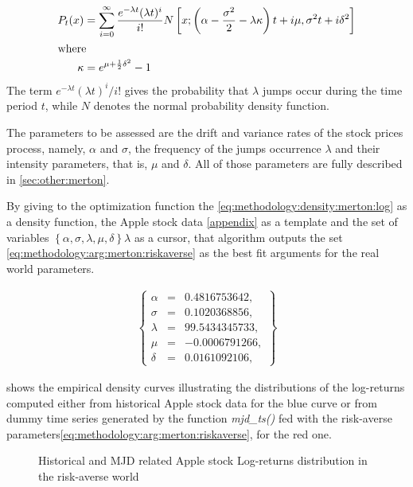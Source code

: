 \documentclass[a4paper, 12pt]{report}
\begin{document}
\begin{align}
  P_t(x) &= \sum_{i=0}^{\infty} 
    \frac{e^{-\lambda t} (\lambda t)^ i}{i!}
    N\left[ 
      x;
      \left( \alpha - \frac{\sigma^2}{2} - \lambda \kappa \right) t + i \mu,
      \sigma^2 t + i\delta^2
    \right]\label{eq:methodology:density:merton:log} \\
\intertext{where}
  \kappa &= e^{\mu + \frac{1}{2} \delta^2} - 1 \notag 
\end{align}
The term $e^{-\lambda t} (\lambda t)^ i / i!$ gives the probability that $\lambda$ jumps occur during the time period $t$, while $N$ denotes the normal probability density function.

The parameters to be assessed are the drift and variance rates of the stock prices process, namely, $\alpha$ and $\sigma$, the frequency of the jumps occurrence $\lambda$ and their intensity parameters, that is, $\mu$ and $\delta$.
All of those parameters are fully described in \cref{sec:other:merton}.

By giving to the optimization function the \cref{eq:methodology:density:merton:log} as a density function, the Apple stock data \cref{appendix} as a template and the set of variables 
$\left\{\alpha, \sigma, \lambda, \mu,  \delta  \right\}\lambda$ 
as a cursor, that algorithm outputs the set \ref{eq:methodology:arg:merton:riskaverse} as the best fit arguments for the real world parameters.

\begin{align}
  \left \{
  \begin{array}{lcl}
    \alpha &= &0.4816753642, \\
    \sigma &= &0.1020368856, \\
    \lambda &= &99.5434345733, \\
    \mu &= &-0.0006791266, \\
    \delta &= &0.0161092106, 
  \end{array}
  \right \}  
  \label{eq:methodology:arg:merton:riskaverse}
\end{align}


 shows the empirical density curves illustrating the distributions of the log-returns computed either from historical Apple stock data for the blue curve or from dummy time series generated by the function \textit{mjd\_ts()} fed with the risk-averse parameters\ref{eq:methodology:arg:merton:riskaverse}, for the red one.


\begin{figure}[h]
  \centering
  
  \caption{Historical and MJD related Apple stock Log-returns distribution in the risk-averse world}
  \label{p:methodology:density:aapl:merton:riskaverse}
\end{figure}
\end{document}
